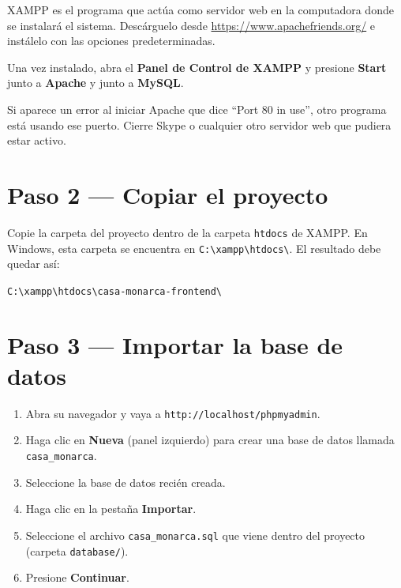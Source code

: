 \documentclass[10pt,letterpaper]{report}
\begin{document}
XAMPP es el programa que actúa como servidor web en la computadora donde se instalará el sistema. Descárguelo desde \url{https://www.apachefriends.org/} e instálelo con las opciones predeterminadas.

Una vez instalado, abra el \textbf{Panel de Control de XAMPP} y presione \textbf{Start} junto a \textbf{Apache} y junto a \textbf{MySQL}.

\begin{consejobox}
Si aparece un error al iniciar Apache que dice ``Port 80 in use'', otro programa está usando ese puerto. Cierre Skype o cualquier otro servidor web que pudiera estar activo.
\end{consejobox}

\section{Paso 2 — Copiar el proyecto}

Copie la carpeta del proyecto dentro de la carpeta \texttt{htdocs} de XAMPP. En Windows, esta carpeta se encuentra en \texttt{C:\textbackslash xampp\textbackslash htdocs\textbackslash}. El resultado debe quedar así:

\begin{center}
\texttt{C:\textbackslash xampp\textbackslash htdocs\textbackslash casa-monarca-frontend\textbackslash}
\end{center}

\section{Paso 3 — Importar la base de datos}

\begin{enumerate}[label=\arabic*.]
  \item Abra su navegador y vaya a \texttt{http://localhost/phpmyadmin}.
  \item Haga clic en \textbf{Nueva} (panel izquierdo) para crear una base de datos llamada \texttt{casa\_monarca}.
  \item Seleccione la base de datos recién creada.
  \item Haga clic en la pestaña \textbf{Importar}.
  \item Seleccione el archivo \texttt{casa\_monarca.sql} que viene dentro del proyecto (carpeta \texttt{database/}).
  \item Presione \textbf{Continuar}.
\end{enumerate}
\end{document}
